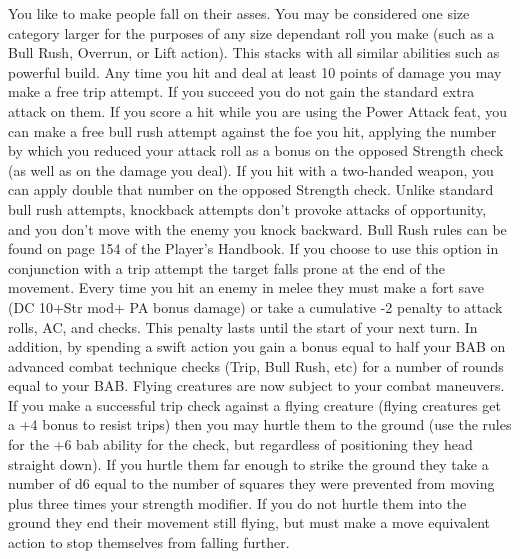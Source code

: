 \begin{multicols}{2}
\label{comm:feat:knockdown}{}
{You like to make people fall on their asses. 
}{You may be considered one size category larger for the purposes of any size dependant roll you make (such as a Bull Rush, Overrun, or Lift action). This stacks with all similar abilities such as powerful build.
}{ Any time you hit and deal at least 10 points of damage you may make a free trip attempt. If you succeed you do not gain the standard extra attack on them.
}{If you score a hit while you are using the Power Attack feat, you can make a free bull rush attempt against the foe you hit, applying the number by which you reduced your attack roll as a bonus on the opposed Strength check (as well as on the damage you deal). If you hit with a two-handed weapon, you can apply double that number on the opposed Strength check. Unlike standard bull rush attempts, knockback attempts don't provoke attacks of opportunity, and you don't move with the enemy you knock backward. Bull Rush rules can be found on page 154 of the Player's Handbook.
If you choose to use this option in conjunction with a trip attempt the target falls prone at the end of the movement.
}{Every time you hit an enemy in melee they must make a fort save (DC 10+Str mod+ PA bonus damage) or take a cumulative -2 penalty to attack rolls, AC, and checks. This penalty lasts until the start of your next turn. In addition, by spending a swift action you gain a bonus equal to half your BAB on advanced combat technique checks (Trip, Bull Rush, etc) for a number of rounds equal to your BAB.
}{Flying creatures are now subject to your combat maneuvers. If you make a successful trip check against a flying creature (flying creatures get a +4 bonus to resist trips) then you may hurtle them to the ground (use the rules for the +6 bab ability for the check, but regardless of positioning they head straight down). If you hurtle them far enough to strike the ground they take a number of d6 equal to the number of squares they were prevented from moving plus three times your strength modifier.
If you do not hurtle them into the ground they end their movement still flying, but must make a move equivalent action to stop themselves from falling further.}


\end{multicols}
